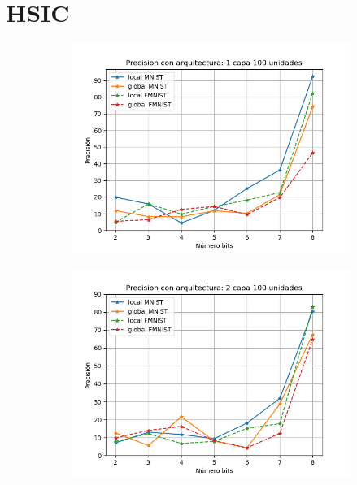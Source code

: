 \section{HSIC}
\begin{figure}[H]
    \centering
    \begin{subfigure}[H]{0.45\textwidth}
    \includegraphics[width=\textwidth]{imagenes/HSIC/Precision con arquitectura: 1 capa 100 unidades.png}
    \end{subfigure}
    \begin{subfigure}[H]{0.45\textwidth}
    \includegraphics[width=\textwidth]{imagenes/HSIC/Precision con arquitectura: 2 capa 100 unidades.png}
    \end{subfigure}

\end{figure}
